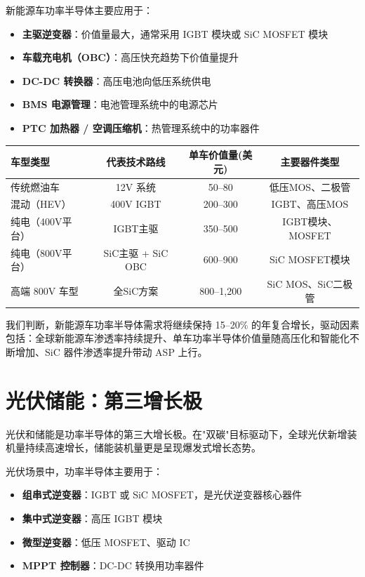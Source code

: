 新能源车功率半导体主要应用于：
\begin{itemize}[leftmargin=2em]
\item \textbf{主驱逆变器}：价值量最大，通常采用 IGBT 模块或 SiC MOSFET 模块
\item \textbf{车载充电机（OBC）}：高压快充趋势下价值量提升
\item \textbf{DC-DC 转换器}：高压电池向低压系统供电
\item \textbf{BMS 电源管理}：电池管理系统中的电源芯片
\item \textbf{PTC 加热器 / 空调压缩机}：热管理系统中的功率器件
\end{itemize}

\begin{exhibitbox}[表 3-3：不同车型功率半导体价值量对比]
\centering
\small
\begin{tabularx}{\textwidth}{X c c c}
\toprule
\textbf{车型类型} & \textbf{代表技术路线} & \textbf{单车价值量(美元)} & \textbf{主要器件类型} \\
\midrule
传统燃油车 & 12V 系统 & 50–80 & 低压MOS、二极管 \\
混动（HEV） & 400V IGBT & 200–300 & IGBT、高压MOS \\
纯电（400V平台） & IGBT主驱 & 350–500 & IGBT模块、MOSFET \\
纯电（800V平台） & SiC主驱 + SiC OBC & 600–900 & SiC MOSFET模块 \\
高端 800V 车型 & 全SiC方案 & 800–1,200 & SiC MOS、SiC二极管 \\
\bottomrule
\end{tabularx}
\end{exhibitbox}

我们判断，新能源车功率半导体需求将继续保持 15–20\% 的年复合增长，驱动因素包括：全球新能源车渗透率持续提升、单车功率半导体价值量随高压化和智能化不断增加、SiC 器件渗透率提升带动 ASP 上行。

\section{光伏储能：第三增长极}

光伏和储能是功率半导体的第三大增长极。在"双碳"目标驱动下，全球光伏新增装机量持续高速增长，储能装机量更是呈现爆发式增长态势。

\vspace{0.3em}

光伏场景中，功率半导体主要用于：
\begin{itemize}[leftmargin=2em]
\item \textbf{组串式逆变器}：IGBT 或 SiC MOSFET，是光伏逆变器核心器件
\item \textbf{集中式逆变器}：高压 IGBT 模块
\item \textbf{微型逆变器}：低压 MOSFET、驱动 IC
\item \textbf{MPPT 控制器}：DC-DC 转换用功率器件
\end{itemize}

